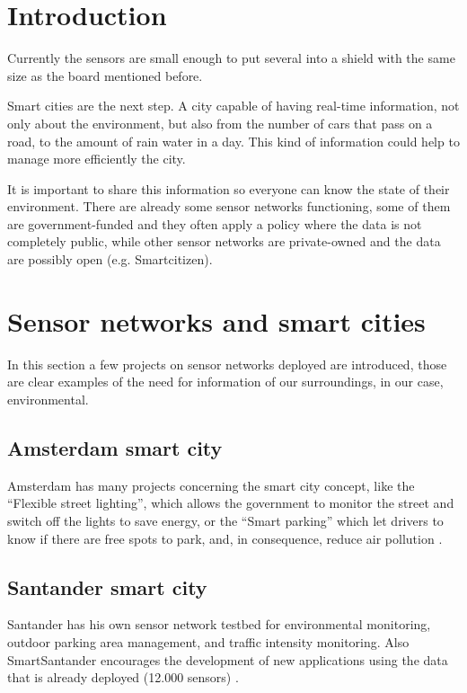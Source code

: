 \documentclass[12pt, a4paper,twoside]{tesi_upf}
\begin{document}
  \section{Introduction}

    Currently the sensors are small enough to put several into a shield with the same size as the board mentioned before.
    
    Smart cities are the next step. A city capable of having real-time information, not only about the environment, but also from the number of cars that pass on a road, to the amount of rain water in a day. This kind of information could help to manage more efficiently the city.
    
    It is important to share this information so everyone can know the state of their environment. There are already some sensor networks functioning, some of them are government-funded and they often apply a policy where the data is not completely public, while other sensor networks are private-owned and the data are possibly open (e.g. Smartcitizen).

  \section{Sensor networks and smart cities}
    In this section a few projects on sensor networks deployed are introduced, those are clear examples of the need for information of our surroundings, in our case, environmental.
    
    \subsection{Amsterdam smart city}
      Amsterdam has many projects concerning the smart city concept, like the ``Flexible street lighting'', which allows the government to monitor the street and switch off the lights to save energy, or the ``Smart parking'' which let drivers to know if there are free spots to park, and, in consequence, reduce air pollution \cite{SmartcityAmsterdam}.
      
    \subsection{Santander smart city}
      Santander has his own sensor network testbed for environmental monitoring, outdoor parking area management, and traffic intensity monitoring. Also SmartSantander encourages the development of new applications using the data that is already deployed (12.000 sensors) \cite{SmartcitySantander}.
    
\end{document}
